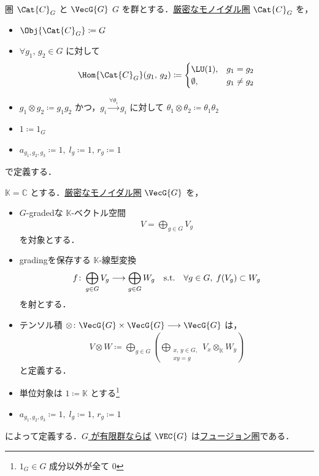 \documentclass[TQFT_main]{subfiles}
\begin{document}
\begin{myexample}[label=def:CG]{圏 $\Cat{C}_G$ と $\VecG{G}$}
    $G$ を群とする．\hyperref[redef:monoidal-category]{厳密なモノイダル圏} $\Cat{C}_G$ を，
    \begin{itemize}
        \item $\Obj{\Cat{C}_G} \coloneqq G$
        \item $\forall g_1,\, g_2 \in G$ に対して
        \begin{align}
            \Hom{\Cat{C}_G}(g_1,\, g_2) \coloneqq 
            \begin{cases}
                \LU(1), &g_1 = g_2 \\
                \emptyset, &g_1 \neq g_2
            \end{cases}
        \end{align}
        \item $g_1 \otimes g_2 \coloneqq g_1 g_2$ かつ，$g_i \xrightarrow{\forall \theta_i}  g_i$ に対して $\theta_1 \otimes \theta_2 \coloneqq \theta_1 \theta_2$
        \item $1 \coloneqq 1_G$
        \item $a_{g_1,g_2,g_3} \coloneqq 1,\; l_{g} \coloneqq 1,\, r_g \coloneqq 1$
    \end{itemize}
    で定義する．
    
    $\mathbb{K} = \mathbb{C}$ とする．\hyperref[redef:monoidal-category]{厳密なモノイダル圏} $\VecG{G}$ を，
    \begin{itemize}
        \item $G$-gradedな $\mathbb{K}$-ベクトル空間
        \begin{align}
            V = \bigoplus_{g \in G} V_g
        \end{align}
        を対象とする．
        \item gradingを保存する $\mathbb{K}$-線型変換
        \begin{align}
            f \colon \bigoplus_{g \in G} V_g \longrightarrow \bigoplus_{g \in G} W_g \quad \mathrm{s.t.} \quad \forall g \in G,\; f (V_g) \subset W_g
        \end{align}
        を射とする．
        \item テンソル積 $\otimes \colon \VecG{G} \times \VecG{G} \lto \VecG{G}$ は，
        \begin{align}
            V \otimes W \coloneqq \bigoplus_{g \in G} \left( \bigoplus_{\substack{x,\, y \in G, \\ xy = g}} V_x \otimes_{\mathbb{K}} W_y\right)
        \end{align}
        と定義する．
        \item 単位対象は $1 \coloneqq \mathbb{K}$ とする\footnote{$1_G \in G$ 成分以外が全て $0$}
        \item $a_{g_1,g_2,g_3} \coloneqq 1,\; l_{g} \coloneqq 1,\, r_g \coloneqq 1$
    \end{itemize}
    によって定義する．\underline{$G$ が有限群ならば} $\VEC{G}$ は\hyperref[def:tensorfusion-cat]{フュージョン圏}である．
\end{myexample}
\end{document}
